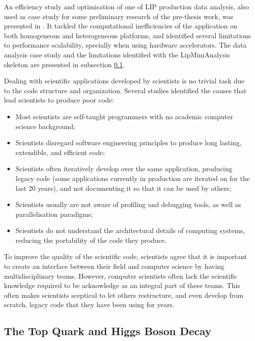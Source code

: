 An efficiency study and optimisation of one of LIP production data analysis, also used as case study for some preliminary research of the pre-thesis work, was presented in \cite{Msc:AMP,paperAMP}. It tackled the computational inefficiencies of the application on both homogeneous and heterogeneous platforms, and identified several limitations to performance scalability, specially when using hardware accelerators. The data analysis case study and the limitations identified with the LipMiniAnalysis skeleton are presented in subsection \ref{ttH}.

Dealing with scientific applications developed by scientists is no trivial task due to the code structure and organization. Several studies \cite{SC:Nature,SC:Develop,SC:SC11,SC:28280} identified the causes that lead scientists to produce poor code:

\begin{center}
	\begin{itemize}
		\item Most scientists are self-taught programmers with no academic computer science background;
		\item Scientists disregard software engineering principles to produce long lasting, extendible, and efficient code;
		\item Scientists often iteratively develop over the same application, producing legacy code (some applications currently in production are iterated on for the last 20 years), and not documenting it so that it can be used by others;
		\item Scientists usually are not aware of profiling and debugging tools, as well as parallelisation paradigms;
		\item Scientists do not understand the architectural details of computing systems, reducing the portability of the code they produce.
	\end{itemize}
\end{center}

To improve the quality of the scientific code, scientists agree that it is important to create an interface between their field and computer science by having multidisciplinary teams. However, computer scientists often lack the scientific knowledge required to be acknowledge as an integral part of these teams. This often makes scientists sceptical to let others restructure, and even develop from scratch, legacy code that they have been using for years.

\subsection{The Top Quark and Higgs Boson Decay}
\label{ttH}

